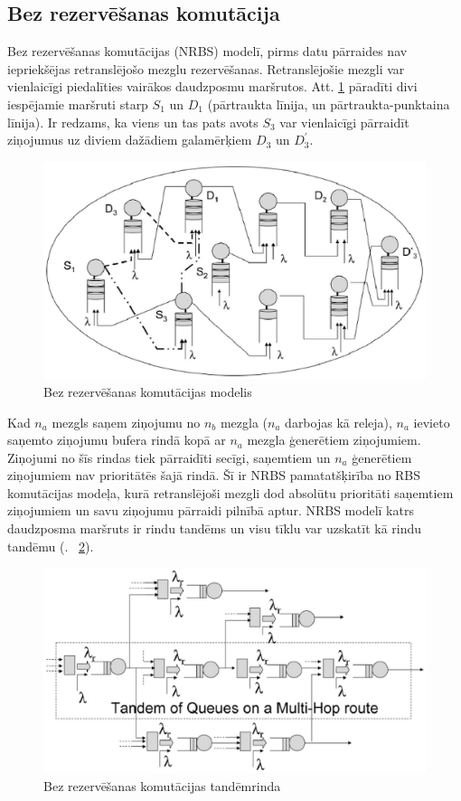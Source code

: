 \subsection{Bez rezervēšanas komutācija}\label{sec:nrbs}
Bez rezervēšanas komutācijas (\acs{NRBS}) modelī, pirms datu pārraides nav iepriekšējas retranslējošo mezglu rezervēšanas. Retranslējošie mezgli var vienlaicīgi piedalīties vairākos daudzposmu maršrutos. Att. \ref{fig:nrb} pāradīti divi iespējamie maršruti starp $S_{1}$ un $D_{1}$ (pārtraukta līnija, un pārtraukta-punktaina līnija). Ir redzams, ka viens un tas pats avots $S_{3}$ var vienlaicīgi pārraidīt ziņojumus uz diviem dažādiem galamērķiem $D_{3}$ un $D_{3}^{'}$.

\begin{figure}[htb!]
\centering
\includegraphics[scale=0.4]{./graph/nrb}
\caption{Bez rezervēšanas komutācijas modelis \cite{route_res}}
\label{fig:nrb}
\end{figure}

Kad $n_{a}$ mezgls saņem ziņojumu no $n_{b}$ mezgla ($n_{a}$ darbojas kā releja), $n_{a}$ ievieto saņemto ziņojumu bufera rindā kopā ar $n_{a}$ mezgla ģenerētiem ziņojumiem. Ziņojumi no šīs rindas tiek pārraidīti secīgi, saņemtiem un $n_{a}$ ģenerētiem ziņojumiem nav prioritātēs šajā rindā.
Šī ir \acs{NRBS} pamatatšķirība no \acs{RBS} komutācijas modeļa, kurā retranslējoši mezgli dod absolūtu prioritāti saņemtiem ziņojumiem un savu ziņojumu pārraidi pilnībā aptur. \ac{NRBS} modelī katrs daudzposma maršruts ir rindu tandēms un visu tīklu var uzskatīt kā rindu tandēmu (\figurename. ~\ref{fig:nrbTandem}).

\begin{figure}[htb!]
\centering
\includegraphics[scale=0.4]{./graph/tandem}
\caption{ Bez rezervēšanas komutācijas tandēmrinda \cite{route_res}}
\label{fig:nrbTandem}
\end{figure}

